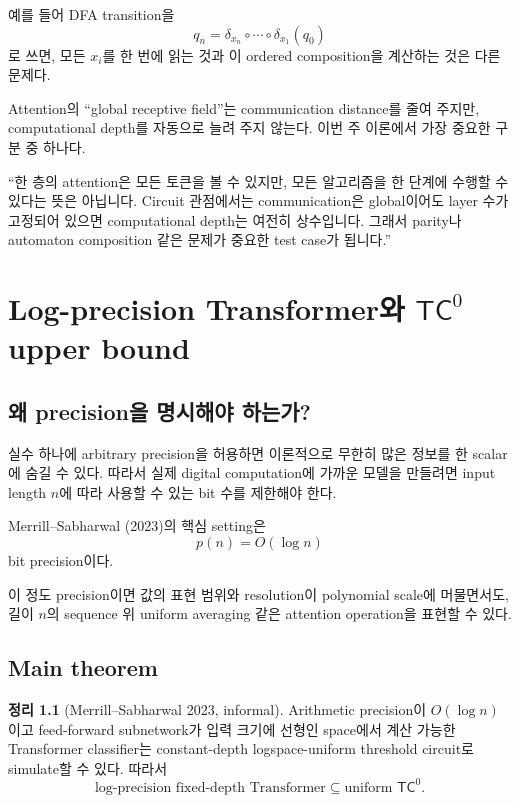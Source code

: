 \documentclass[11pt,a4paper,oneside,openany]{memoir}
\theoremstyle{definition}
\newtheorem{theorem}{정리}[chapter]
\newcommand{\TC}{\mathsf{TC}}
\begin{document}
예를 들어 DFA transition을
\[
q_n
=
\delta_{x_n}\circ\cdots\circ\delta_{x_1}(q_0)
\]
로 쓰면, 모든 $x_i$를 한 번에 읽는 것과 이 ordered composition을 계산하는 것은 다른 문제다.

\begin{keybox}
Attention의 ``global receptive field''는 communication distance를 줄여 주지만, computational depth를 자동으로 늘려 주지 않는다.
이번 주 이론에서 가장 중요한 구분 중 하나다.
\end{keybox}

\begin{presentbox}
``한 층의 attention은 모든 토큰을 볼 수 있지만, 모든 알고리즘을 한 단계에 수행할 수 있다는 뜻은 아닙니다. Circuit 관점에서는 communication은 global이어도 layer 수가 고정되어 있으면 computational depth는 여전히 상수입니다. 그래서 parity나 automaton composition 같은 문제가 중요한 test case가 됩니다.''
\end{presentbox}

\chapter{\texorpdfstring{Log-precision Transformer와 $\TC^0$ upper bound}{Log-precision Transformer와 TC0 upper bound}}

\section{왜 precision을 명시해야 하는가?}

실수 하나에 arbitrary precision을 허용하면 이론적으로 무한히 많은 정보를 한 scalar에 숨길 수 있다.
따라서 실제 digital computation에 가까운 모델을 만들려면 input length $n$에 따라 사용할 수 있는 bit 수를 제한해야 한다.

Merrill--Sabharwal (2023)의 핵심 setting은
\[
p(n)=O(\log n)
\]
bit precision이다.

이 정도 precision이면 값의 표현 범위와 resolution이 polynomial scale에 머물면서도,
길이 $n$의 sequence 위 uniform averaging 같은 attention operation을 표현할 수 있다.

\section{Main theorem}

\begin{theorem}[Merrill--Sabharwal 2023, informal]
Arithmetic precision이 $O(\log n)$이고 feed-forward subnetwork가 입력 크기에 선형인 space에서 계산 가능한 Transformer classifier는
constant-depth logspace-uniform threshold circuit로 simulate할 수 있다. 따라서
\[
\boxed{\text{log-precision fixed-depth Transformer}\subseteq \text{uniform }\TC^0.}
\]
\end{theorem}
\end{document}
